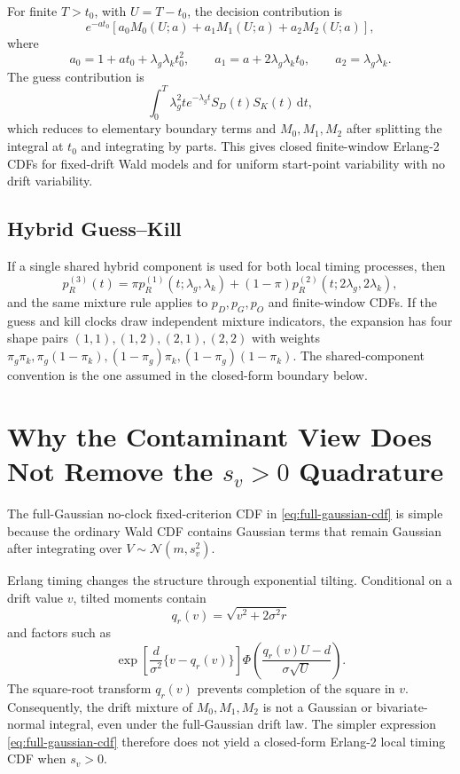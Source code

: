 \documentclass[12pt]{article}
\newcommand{\dd}{\,\mathrm{d}}
\newcommand{\Normal}{\mathcal{N}}
\newcommand{\PhiN}{\Phi}
\begin{document}
For finite $T>t_0$, with $U=T-t_0$, the decision contribution is
\begin{equation}
  e^{-at_0}\left[a_0M_0(U;a)+a_1M_1(U;a)+a_2M_2(U;a)\right],
\end{equation}
where
\begin{equation}
  a_0=1+at_0+\lambda_g\lambda_kt_0^2,
  \qquad
  a_1=a+2\lambda_g\lambda_kt_0,
  \qquad
  a_2=\lambda_g\lambda_k.
\end{equation}
The guess contribution is
\begin{equation}
  \int_0^T \lambda_g^2t e^{-\lambda_gt}S_D(t)S_K(t)\dd t,
\end{equation}
which reduces to elementary boundary terms and $M_0,M_1,M_2$ after splitting the integral at $t_0$ and integrating by parts. This gives closed finite-window Erlang-2 CDFs for fixed-drift Wald models and for uniform start-point variability with no drift variability.

\subsection{Hybrid Guess--Kill}
If a single shared hybrid component is used for both local timing processes, then
\begin{equation}
  p_R^{(3)}(t)
  =\pi p_R^{(1)}(t;\lambda_g,\lambda_k)
  +(1-\pi)p_R^{(2)}(t;2\lambda_g,2\lambda_k),
  \label{eq:hybrid-local-density}
\end{equation}
and the same mixture rule applies to $p_D,p_G,p_O$ and finite-window CDFs. If the guess and kill clocks draw independent mixture indicators, the expansion has four shape pairs $(1,1),(1,2),(2,1),(2,2)$ with weights $\pi_g\pi_k,\pi_g(1-\pi_k),(1-\pi_g)\pi_k,(1-\pi_g)(1-\pi_k)$. The shared-component convention is the one assumed in the closed-form boundary below.

\section{Why the Contaminant View Does Not Remove the \texorpdfstring{$s_v>0$}{sv > 0} Quadrature}
The full-Gaussian no-clock fixed-criterion CDF in \eqref{eq:full-gaussian-cdf} is simple because the ordinary Wald CDF contains Gaussian terms that remain Gaussian after integrating over $V\sim\Normal(m,s_v^2)$.

Erlang timing changes the structure through exponential tilting. Conditional on a drift value $v$, tilted moments contain
\begin{equation}
  q_r(v)=\sqrt{v^2+2\sigma^2r}
\end{equation}
and factors such as
\begin{equation}
  \exp\!\left[\frac{d}{\sigma^2}\{v-q_r(v)\}\right]
  \PhiN\!\left(\frac{q_r(v)U-d}{\sigma\sqrt{U}}\right).
\end{equation}
The square-root transform $q_r(v)$ prevents completion of the square in $v$. Consequently, the drift mixture of $M_0,M_1,M_2$ is not a Gaussian or bivariate-normal integral, even under the full-Gaussian drift law. The simpler expression \eqref{eq:full-gaussian-cdf} therefore does not yield a closed-form Erlang-2 local timing CDF when $s_v>0$.
\end{document}
